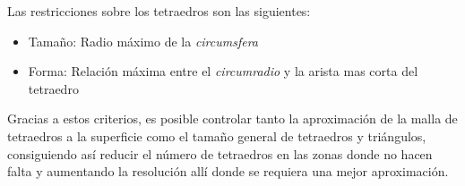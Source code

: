 Las restricciones sobre los tetraedros son las siguientes:
\begin{itemize}
    \item Tamaño: Radio máximo de la \emph{circumsfera}
    \item Forma: Relación máxima entre el \emph{circumradio} y la arista mas corta del tetraedro
\end{itemize}



Gracias a estos criterios, es posible controlar tanto la aproximación de la malla de tetraedros a la superficie como el tamaño general de tetraedros y triángulos, consiguiendo así reducir el número de tetraedros en las zonas donde no hacen falta y aumentando la resolución allí donde se requiera una mejor aproximación.
